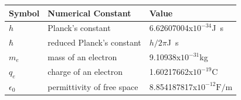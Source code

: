 \documentclass[12pt]{article}
\begin{document}
\renewcommand{\arraystretch}{1.2}
\noindent \begin{longtable*}{l l p{12cm}} \toprule
	\textbf{Symbol} & \textbf{Numerical Constant} & \textbf{Value}\\
	\midrule 
	$h$ & Planck's constant & 6.62607004x$10^{-34}$\si{\joule\second} \\
	$\hbar$ & reduced Planck's constant & $h/2\pi$\si{\joule\second} \\
	$m_e$ & mass of an electron & 9.10938x$10^{-31}$\si{\kilogram} \\
	$q_e$ & charge of an electron & 1.60217662x$10^{-19}$\si{\coulomb} \\
	$\epsilon_0$ & permittivity of free space  & 8.854187817x$10^{−12} 
	\si{\farad/\metre}$ \\
	
	\bottomrule
\end{longtable*}
\end{document}

